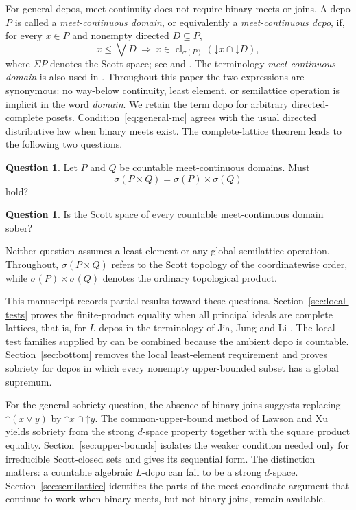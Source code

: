 \documentclass[11pt,reqno]{amsart}
\theoremstyle{definition}
\newtheorem{question}[theorem]{Question}
\theoremstyle{remark}
\numberwithin{equation}{section}
\newcommand{\down}[1]{\mathord{\downarrow}#1}
\newcommand{\up}[1]{\mathord{\uparrow}#1}
\newcommand{\Sc}{\sigma}
\newcommand{\Sig}{\Sigma}
\newcommand{\jc}{\vee}
\newcommand{\cl}{\operatorname{cl}}
\begin{document}
For general dcpos, meet-continuity does not require binary meets or joins. A dcpo $P$ is called a \emph{meet-continuous domain}, or equivalently a \emph{meet-continuous dcpo}, if, for every $x\in P$ and nonempty directed $D\subseteq P$,
\begin{equation}\label{eq:general-mc}
 x\le\bigvee D
 ~\Longrightarrow~
 x\in\cl_{\sigma(P)}(\down x\cap\down D),
\end{equation}
where $\Sig P$ denotes the Scott space; see \cite{KouLiuLuo} and \cite[Section~3]{JiaJungLi}. The terminology \emph{meet-continuous domain} is also used in \cite{LyuKou}. Throughout this paper the two expressions are synonymous: no way-below continuity, least element, or semilattice operation is implicit in the word \emph{domain}. We retain the term dcpo for arbitrary directed-complete posets. Condition~\eqref{eq:general-mc} agrees with the usual directed distributive law when binary meets exist. The complete-lattice theorem leads to the following two questions.

\begin{question}\label{quest:mc-dcpo-product}
Let $P$ and $Q$ be countable meet-continuous domains. Must
\[
 \Sc(P\times Q)=\Sc(P)\times\Sc(Q)
\]
hold?
\end{question}

\begin{question}\label{quest:mc-dcpo-sober}
Is the Scott space of every countable meet-continuous domain sober?
\end{question}

Neither question assumes a least element or any global semilattice operation. Throughout, $\Sc(P\times Q)$ refers to the Scott topology of the coordinatewise order, while $\Sc(P)\times\Sc(Q)$ denotes the ordinary topological product.

This manuscript records partial results toward these questions. Section~\ref{sec:local-tests} proves the finite-product equality when all principal ideals are complete lattices, that is, for $L$-dcpos in the terminology of Jia, Jung and Li \cite{JiaJungLi}. The local test families supplied by \cite{XuJi} can be combined because the ambient dcpo is countable. Section~\ref{sec:bottom} removes the local least-element requirement and proves sobriety for dcpos in which every nonempty upper-bounded subset has a global supremum.

For the general sobriety question, the absence of binary joins suggests replacing $\up(x\jc y)$ by $\up x\cap\up y$. The common-upper-bound method of Lawson and Xu \cite{LawsonXu,LawsonXuLower} yields sobriety from the strong $d$-space property together with the square product equality. Section~\ref{sec:upper-bounds} isolates the weaker condition needed only for irreducible Scott-closed sets and gives its sequential form. The distinction matters: a countable algebraic $L$-dcpo can fail to be a strong $d$-space. Section~\ref{sec:semilattice} identifies the parts of the meet-coordinate argument that continue to work when binary meets, but not binary joins, remain available.
\end{document}

